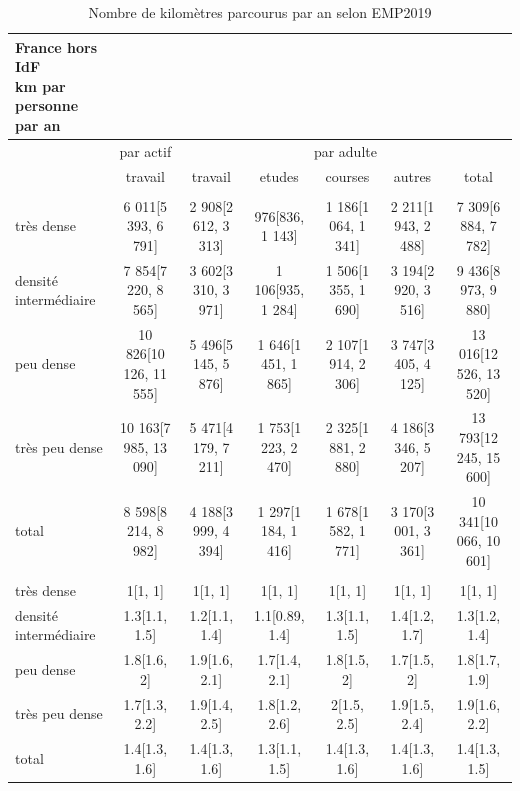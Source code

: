 \documentclass[
  9pt,
  a4paper,
  DIV=11]{scrreprt}
\begin{document}
\begin{longtable}{lcccccc}

\caption{\label{tbl-empkm}Nombre de kilomètres parcourus par an selon
EMP2019}

\tabularnewline

\caption*{
{\large France hors IdF} \\ 
{\small km par personne par an}
} \\ 
\toprule
 & par actif & \multicolumn{5}{c}{par adulte} \\ 
\cmidrule(lr){2-2} \cmidrule(lr){3-7}
 & travail & travail & etudes & courses & autres & total \\ 
\midrule\addlinespace[2.5pt]
\multicolumn{7}{l}{km} \\ 
\midrule\addlinespace[2.5pt]
très dense & 6 011{[}5 393, 6 791{]} & 2 908{[}2 612, 3 313{]} & 976{[}836, 1 143{]} & 1 186{[}1 064, 1 341{]} & 2 211{[}1 943, 2 488{]} & 7 309{[}6 884, 7 782{]} \\ 
densité intermédiaire & 7 854{[}7 220, 8 565{]} & 3 602{[}3 310, 3 971{]} & 1 106{[}935, 1 284{]} & 1 506{[}1 355, 1 690{]} & 3 194{[}2 920, 3 516{]} & 9 436{[}8 973, 9 880{]} \\ 
peu dense & 10 826{[}10 126, 11 555{]} & 5 496{[}5 145, 5 876{]} & 1 646{[}1 451, 1 865{]} & 2 107{[}1 914, 2 306{]} & 3 747{[}3 405, 4 125{]} & 13 016{[}12 526, 13 520{]} \\ 
très peu dense & 10 163{[}7 985, 13 090{]} & 5 471{[}4 179, 7 211{]} & 1 753{[}1 223, 2 470{]} & 2 325{[}1 881, 2 880{]} & 4 186{[}3 346, 5 207{]} & 13 793{[}12 245, 15 600{]} \\ 
total & 8 598{[}8 214, 8 982{]} & 4 188{[}3 999, 4 394{]} & 1 297{[}1 184, 1 416{]} & 1 678{[}1 582, 1 771{]} & 3 170{[}3 001, 3 361{]} & 10 341{[}10 066, 10 601{]} \\ 
\midrule\addlinespace[2.5pt]
\multicolumn{7}{l}{relatif} \\ 
\midrule\addlinespace[2.5pt]
très dense & 1{[}1, 1{]} & 1{[}1, 1{]} & 1{[}1, 1{]} & 1{[}1, 1{]} & 1{[}1, 1{]} & 1{[}1, 1{]} \\ 
densité intermédiaire & 1.3{[}1.1, 1.5{]} & 1.2{[}1.1, 1.4{]} & 1.1{[}0.89, 1.4{]} & 1.3{[}1.1, 1.5{]} & 1.4{[}1.2, 1.7{]} & 1.3{[}1.2, 1.4{]} \\ 
peu dense & 1.8{[}1.6, 2{]} & 1.9{[}1.6, 2.1{]} & 1.7{[}1.4, 2.1{]} & 1.8{[}1.5, 2{]} & 1.7{[}1.5, 2{]} & 1.8{[}1.7, 1.9{]} \\ 
très peu dense & 1.7{[}1.3, 2.2{]} & 1.9{[}1.4, 2.5{]} & 1.8{[}1.2, 2.6{]} & 2{[}1.5, 2.5{]} & 1.9{[}1.5, 2.4{]} & 1.9{[}1.6, 2.2{]} \\ 
total & 1.4{[}1.3, 1.6{]} & 1.4{[}1.3, 1.6{]} & 1.3{[}1.1, 1.5{]} & 1.4{[}1.3, 1.6{]} & 1.4{[}1.3, 1.6{]} & 1.4{[}1.3, 1.5{]} \\ 
\bottomrule

\end{longtable}
\end{document}
